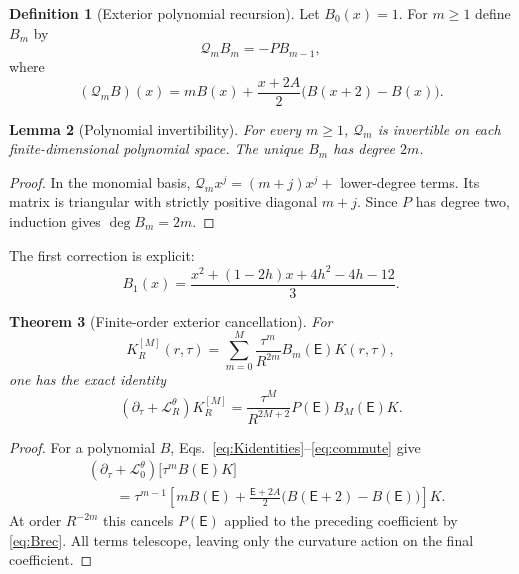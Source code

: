 \documentclass[aps,prd,reprint,superscriptaddress,nofootinbib,floatfix]{revtex4-2}
\newtheorem{theorem}{Theorem}
\newtheorem{lemma}[theorem]{Lemma}
\theoremstyle{definition}
\newtheorem{definition}[theorem]{Definition}
\theoremstyle{remark}
\newcommand{\cL}{\mathcal{L}}
\newcommand{\Eul}{\mathsf E}
\begin{document}
\begin{definition}[Exterior polynomial recursion]\label{def:Brec}
	Let $B_0(x)=1$. For $m\ge1$ define $B_m$ by
	\begin{equation}
		\mathcal Q_mB_m=-P B_{m-1},
		\label{eq:Brec}
	\end{equation}
	where
	\begin{equation}
		(\mathcal Q_mB)(x)
		=mB(x)+\frac{x+2A}{2}\bigl(B(x+2)-B(x)\bigr).
		\label{eq:Qm}
	\end{equation}
\end{definition}

\begin{lemma}[Polynomial invertibility]\label{lem:Qinvert}
	For every $m\ge1$, $\mathcal Q_m$ is invertible on each finite-dimensional polynomial space. The unique $B_m$ has degree $2m$.
\end{lemma}

\begin{proof}
	In the monomial basis, $\mathcal Q_m x^j=(m+j)x^j+$ lower-degree terms. Its matrix is triangular with strictly positive diagonal $m+j$. Since $P$ has degree two, induction gives $\deg B_m=2m$.
\end{proof}

The first correction is explicit:
\begin{equation}
	B_1(x)=\frac{x^2+(1-2h)x+4h^2-4h-12}{3}.
	\label{eq:B1}
\end{equation}

\begin{theorem}[Finite-order exterior cancellation]\label{thm:extfinite}
	For
	\begin{equation}
		K_R^{[M]}(r,\tau)=\sum_{m=0}^M\frac{\tau^m}{R^{2m}}B_m(\Eul)K(r,\tau),
		\label{eq:KRfinite}
	\end{equation}
	one has the exact identity
	\begin{equation}
		(\partial_\tau+\cL_R^\theta)K_R^{[M]}
		=\frac{\tau^M}{R^{2M+2}}P(\Eul)B_M(\Eul)K.
		\label{eq:KRremainder}
	\end{equation}
\end{theorem}

\begin{proof}
	For a polynomial $B$, Eqs.~\eqref{eq:Kidentities}--\eqref{eq:commute} give
	\begin{align}
		 & (\partial_\tau+\cL_0^\theta)\bigl[\tau^mB(\Eul)K\bigr]\nonumber \\
		 & \qquad=\tau^{m-1}\left[mB(\Eul)
			+\frac{\Eul+2A}{2}\bigl(B(\Eul+2)-B(\Eul)\bigr)\right]K.
		\label{eq:H0Bm}
	\end{align}
	At order $R^{-2m}$ this cancels $P(\Eul)$ applied to the preceding coefficient by \eqref{eq:Brec}. All terms telescope, leaving only the curvature action on the final coefficient.
\end{proof}
\end{document}
